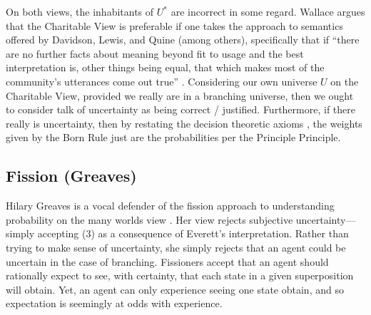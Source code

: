 \documentclass{article}
\begin{document}
On both views, the inhabitants of $U^*$ are incorrect in some regard. Wallace argues that the Charitable View is preferable if one takes the approach to semantics offered by Davidson, Lewis, and Quine (among others), specifically that if ``there are no further facts about meaning beyond fit to usage and the best interpretation is, other things being equal, that which makes most of the community’s utterances come out true'' \parencite[15]{wallaceEpistemologyQuantizedCircumstances2006}. Considering our own universe $U$ on the Charitable View, provided we really are in a branching universe, then we ought to consider talk of uncertainty as being correct / justified. Furthermore, if there really is uncertainty, then by restating the decision theoretic axioms \parencite{wallaceEverettianRationalityDefending2003a}, the weights given by the Born Rule just are the probabilities per the Principle Principle.
 \vspace{2em}





\subsection{Fission (Greaves)}

Hilary Greaves is a vocal defender of the fission approach to understanding probability on the many worlds view \parencite{greavesEverettEvidence2010, greavesProbabilityEverettInterpretation2007, greavesUnderstandingDeutschsProbability2004}. 
Her view rejects subjective uncertainty—simply accepting (3) as a consequence of Everett's interpretation.
Rather than trying to make sense of uncertainty, she simply rejects that an agent could be uncertain in the case of branching.
Fissioners accept that an agent should rationally expect to see, with certainty, that each state in a given superposition will obtain. 
Yet, an agent can only experience seeing one state obtain, and so expectation is seemingly at odds with experience.
\end{document}
